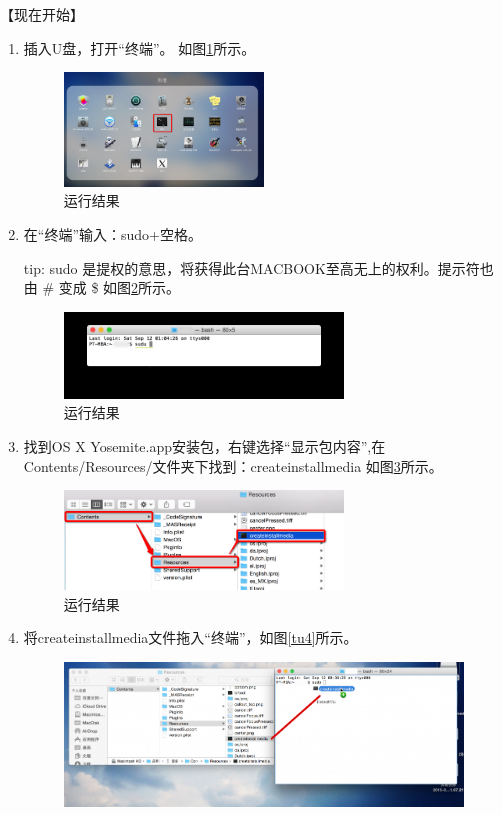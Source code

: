 \documentclass{article}
\begin{document}
【现在开始】
\begin{enumerate}
\item 插入U盘，打开“终端”。
如图\ref{tu1}所示。
\begin{figure}[!htb] %
\centering
\includegraphics[width=0.5\textwidth]{figures/tu1.png}
\caption{运行结果}
\label{tu1}
\end{figure}
\item 在“终端”输入：sudo+空格。\par
tip: sudo 是提权的意思，将获得此台MACBOOK至高无上的权利。提示符也由 \# 变成 \$
如图\ref{tu2}所示。
\begin{figure}[!htb] %
\centering
\includegraphics[width=0.7\textwidth]{figures/tu2.png}
\caption{运行结果}
\label{tu2}
\end{figure}
\item 找到OS X Yosemite.app安装包，右键选择“显示包内容”,在Contents/Resources/文件夹下找到：createinstallmedia 如图\ref{tu3}所示。
\begin{figure}[!htb] %
\centering
\includegraphics[width=0.7\textwidth]{figures/tu3.png}
\caption{运行结果}
\label{tu3}
\end{figure}
\item 将createinstallmedia文件拖入“终端”，如图\ref{tu4}所示。
\begin{figure}[!htb] %
\centering
\includegraphics[width=1.1\textwidth]{figures/tu4.png}

\end{figure}
\end{enumerate}
\end{document}
